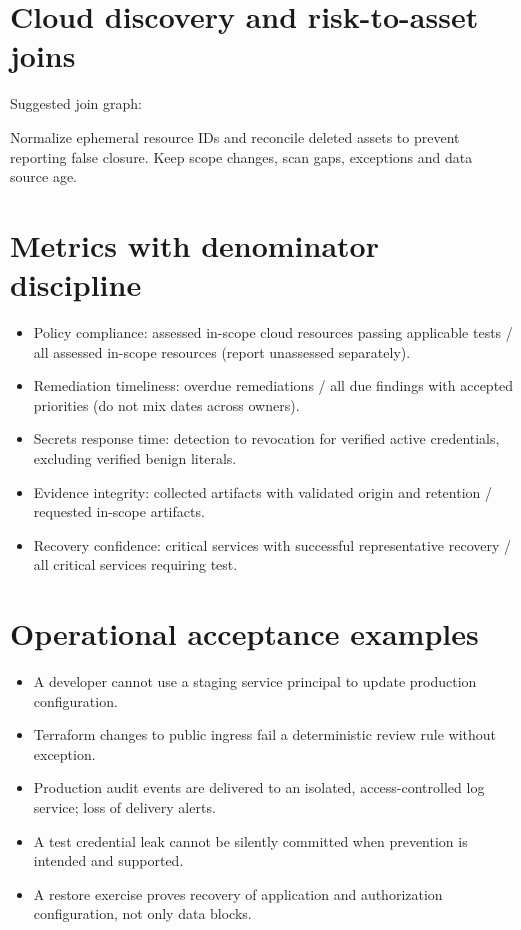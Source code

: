 \documentclass[11pt,letterpaper]{article}
\begin{document}
\section{Cloud discovery and risk-to-asset joins}
Suggested join graph:\par
{}
Normalize ephemeral resource IDs and reconcile deleted assets to prevent reporting false closure. Keep scope changes, scan gaps, exceptions and data source age.
\section{Metrics with denominator discipline}
\begin{itemize}
\item Policy compliance: assessed in-scope cloud resources passing applicable tests / all assessed in-scope resources (report unassessed separately).
\item Remediation timeliness: overdue remediations / all due findings with accepted priorities (do not mix dates across owners).
\item Secrets response time: detection to revocation for verified active credentials, excluding verified benign literals.
\item Evidence integrity: collected artifacts with validated origin and retention / requested in-scope artifacts.
\item Recovery confidence: critical services with successful representative recovery / all critical services requiring test.
\end{itemize}

\section{Operational acceptance examples}
\begin{itemize}
\item A developer cannot use a staging service principal to update production configuration.
\item Terraform changes to public ingress fail a deterministic review rule without exception.
\item Production audit events are delivered to an isolated, access-controlled log service; loss of delivery alerts.
\item A test credential leak cannot be silently committed when prevention is intended and supported.
\item A restore exercise proves recovery of application and authorization configuration, not only data blocks.
\end{itemize}
\end{document}
